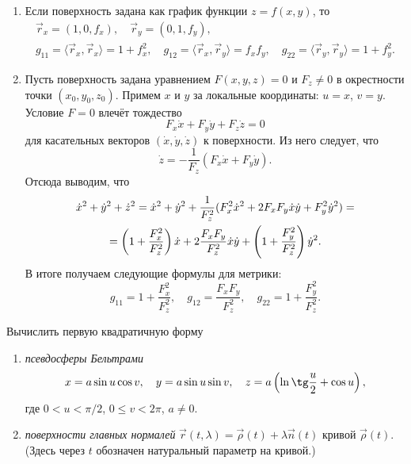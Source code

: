 \begin{example} \label{example:IFormOnSurfaces}
	\begin{enumerate}[nolistsep, label=(\arabic*)]
		\item Если поверхность задана как график функции $z = f(x, y)$, то
			\begin{gather*}
				\vec{r}_x = (1, 0, f_x),\quad\vec{r}_y = (0, 1, f_y),\\
				g_{11} = \langle\vec{r}_x, \vec{r}_x\rangle = 1 + f_x^2,\quad g_{12} = \langle\vec{r}_x, \vec{r}_y\rangle = f_xf_y,\quad g_{22} = \langle\vec{r}_y, \vec{r}_y\rangle = 1 + f_y^2.
			\end{gather*}
		\item Пусть поверхность задана уравнением $F(x, y, z) = 0$ и $F_z \ne 0$ в окрестности точки $(x_0, y_0, z_0)$. Примем $x$ и $y$ за локальные координаты: $u = x$, $v = y$. Условие $F = 0$ влечёт тождество
			\[
				F_x\dot{x} + F_y\dot{y} + F_z\dot{z} = 0
			\]
			для касательных векторов $(\dot{x}, \dot{y}, \dot{z})$ к поверхности. Из него следует, что
			\[
				\dot{z} = -\frac{1}{F_z}(F_x\dot{x} + F_y\dot{y}).
			\]
			Отсюда выводим, что
			\begin{multline*}
				\dot{x}^2 + \dot{y}^2 + \dot{z}^2 = \dot{x}^2 + \dot{y}^2 + \frac{1}{F_z^2}(F_x^2\dot{x}^2 + 2F_xF_y\dot{x}\dot{y} + F_y^2\dot{y}^2) =\\ = \left(1 + \frac{F_x^2}{F_z^2}\right)\dot{x} + 2\frac{F_xF_y}{F_z^2}\dot{x}\dot{y} + \left(1 + \frac{F_y^2}{F_z^2}\right)\dot{y}^2.
			\end{multline*}
			В итоге получаем следующие формулы для метрики:
			\[
				g_{11} = 1 + \frac{F_x^2}{F_z^2},\quad g_{12} = \frac{F_xF_y}{F_z^2},\quad g_{22} = 1 + \frac{F_y^2}{F_z^2}.
			\]
	\end{enumerate}
\end{example}

\begin{problem} \label{problem:FindG}
	Вычислить первую квадратичную форму
	\begin{enumerate}[nolistsep, label=(\arabic*)]
		\item \textit{псевдосферы Бельтрами}
			\[
				x = a\sin u\cos v,\quad y = a\sin u\sin v,\quad z = a\br{\ln\tg\frac{u}{2} + \cos u},
			\]
			где $0 < u < \pi / 2$, $0 \leqslant v < 2\pi$, $a \ne 0$.
		\item \textit{поверхности главных нормалей} $\vec{r}(t, \lambda) = \vec{\rho}(t) + \lambda\vec{n}(t)$ кривой $\vec{\rho}(t)$. (Здесь через $t$ обозначен натуральный параметр на кривой.)
	\end{enumerate}
\end{problem}

